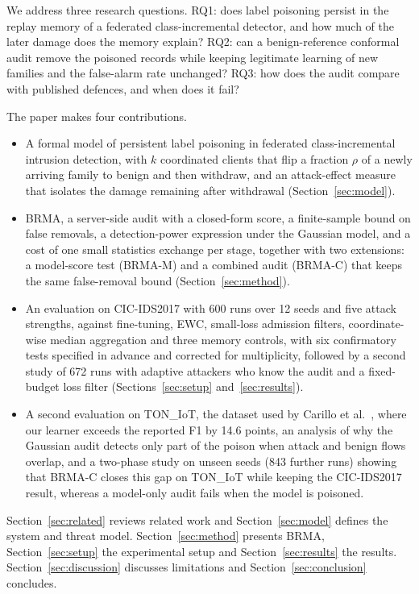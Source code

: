 \documentclass[pdflatex,sn-mathphys-num]{sn-jnl}
\theoremstyle{thmstyleone}
\theoremstyle{thmstylethree}
\begin{document}
We address three research questions. RQ1: does label poisoning persist in the replay memory of a federated class-incremental detector, and how much of the later damage does the memory explain? RQ2: can a benign-reference conformal audit remove the poisoned records while keeping legitimate learning of new families and the false-alarm rate unchanged? RQ3: how does the audit compare with published defences, and when does it fail?

The paper makes four contributions.
\begin{itemize}
\item A formal model of persistent label poisoning in federated class-incremental intrusion detection, with $k$ coordinated clients that flip a fraction $\rho$ of a newly arriving family to benign and then withdraw, and an attack-effect measure that isolates the damage remaining after withdrawal (Section~\ref{sec:model}).
\item BRMA, a server-side audit with a closed-form score, a finite-sample bound on false removals, a detection-power expression under the Gaussian model, and a cost of one small statistics exchange per stage, together with two extensions: a model-score test (BRMA-M) and a combined audit (BRMA-C) that keeps the same false-removal bound (Section~\ref{sec:method}).
\item An evaluation on CIC-IDS2017 with 600 runs over 12 seeds and five attack strengths, against fine-tuning, EWC, small-loss admission filters, coordinate-wise median aggregation and three memory controls, with six confirmatory tests specified in advance and corrected for multiplicity, followed by a second study of 672 runs with adaptive attackers who know the audit and a fixed-budget loss filter (Sections~\ref{sec:setup} and~\ref{sec:results}).
\item A second evaluation on TON\_IoT, the dataset used by Carillo et al.\ \cite{carillo}, where our learner exceeds the reported F1 by 14.6 points, an analysis of why the Gaussian audit detects only part of the poison when attack and benign flows overlap, and a two-phase study on unseen seeds (843 further runs) showing that BRMA-C closes this gap on TON\_IoT while keeping the CIC-IDS2017 result, whereas a model-only audit fails when the model is poisoned.
\end{itemize}

Section~\ref{sec:related} reviews related work and Section~\ref{sec:model} defines the system and threat model. Section~\ref{sec:method} presents BRMA, Section~\ref{sec:setup} the experimental setup and Section~\ref{sec:results} the results. Section~\ref{sec:discussion} discusses limitations and Section~\ref{sec:conclusion} concludes.
\end{document}
